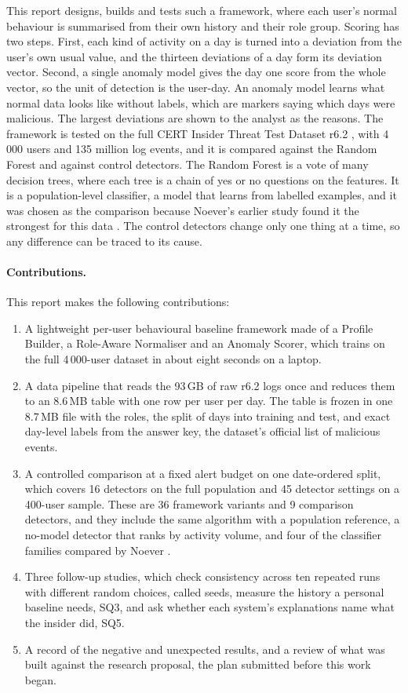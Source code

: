 \documentclass[a4paper,12pt]{article}
\begin{document}
This report designs, builds and tests such a framework, where each user's normal behaviour is summarised from their own history and their role group. Scoring has two steps. First, each kind of activity on a day is turned into a deviation from the user's own usual value, and the thirteen deviations of a day form its deviation vector. Second, a single anomaly model gives the day one score from the whole vector, so the unit of detection is the user-day. An anomaly model learns what normal data looks like without labels, which are markers saying which days were malicious. The largest deviations are shown to the analyst as the reasons. The framework is tested on the full CERT Insider Threat Test Dataset r6.2 \cite{Lindauer2020,Glasser2013}, with 4\,000 users and 135 million log events, and it is compared against the Random Forest and against control detectors. The Random Forest is a vote of many decision trees, where each tree is a chain of yes or no questions on the features. It is a population-level classifier, a model that learns from labelled examples, and it was chosen as the comparison because Noever's earlier study found it the strongest for this data \cite{Noever2019}. The control detectors change only one thing at a time, so any difference can be traced to its cause.

\paragraph{Contributions.} This report makes the following contributions:
\begin{enumerate}
   \item A lightweight per-user behavioural baseline framework made of a Profile Builder, a Role-Aware Normaliser and an Anomaly Scorer, which trains on the full 4\,000-user dataset in about eight seconds on a laptop.
   \item A data pipeline that reads the 93\,GB of raw r6.2 logs once and reduces them to an 8.6\,MB table with one row per user per day. The table is frozen in one 8.7\,MB file with the roles, the split of days into training and test, and exact day-level labels from the answer key, the dataset's official list of malicious events.
   \item A controlled comparison at a fixed alert budget on one date-ordered split, which covers 16 detectors on the full population and 45 detector settings on a 400-user sample. These are 36 framework variants and 9 comparison detectors, and they include the same algorithm with a population reference, a no-model detector that ranks by activity volume, and four of the classifier families compared by Noever \cite{Noever2019}.
   \item Three follow-up studies, which check consistency across ten repeated runs with different random choices, called seeds, measure the history a personal baseline needs, SQ3, and ask whether each system's explanations name what the insider did, SQ5.
   \item A record of the negative and unexpected results, and a review of what was built against the research proposal, the plan submitted before this work began.
\end{enumerate}
\end{document}
